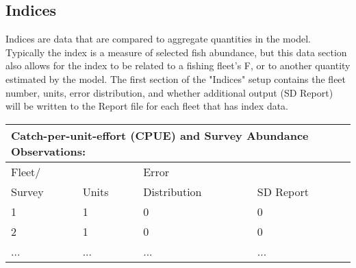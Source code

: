 \subsection{Indices}
Indices are data that are compared to aggregate quantities in the model.  Typically the index is a measure of selected fish abundance, but this data section also allows for the index to be related to a fishing fleet's F, or to another quantity estimated by the model.  The first section of the "Indices" setup contains the fleet number, units, error distribution, and whether additional output (SD Report) will be written to the Report file for each fleet that has index data.

\begin{center}
	\begin{tabular}{p{3cm} p{2cm} p{3cm} p{6cm}}
		\multicolumn{4}{l}{Catch-per-unit-effort (CPUE) and Survey Abundance Observations:}\\
		\hline
		Fleet/ &        & Error      &  \Tstrut\\
		Survey & Units  & Distribution & SD Report \Bstrut\\
		\hline
		1 & 1 & 0 & 0 \Tstrut\\
		2 & 1 & 0 & 0 \\
		... & ... & ... & ... \Bstrut\\
		\hline
	\end{tabular}		
\end{center}


